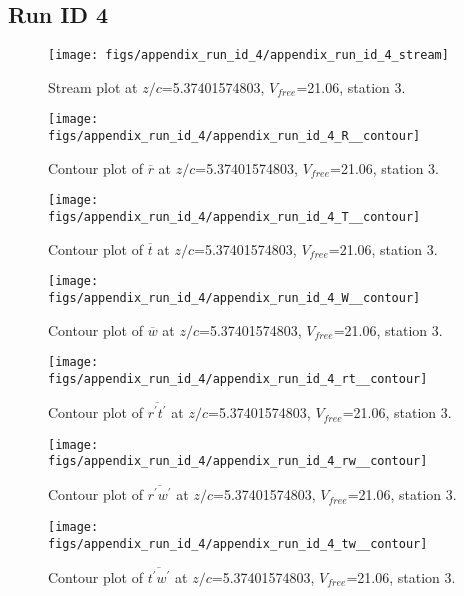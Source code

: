 \subsection{Run ID 4}
\begin{figure}[H]
\centering
\texttt{[image: figs/appendix\_run\_id\_4/appendix\_run\_id\_4\_stream]}
\caption{Stream plot at $z/c$=5.37401574803, $V_{free}$=21.06, station 3.}
\label{fig:appendix_run_id_4_stream}
\end{figure}


\begin{figure}[H]
\centering
\texttt{[image: figs/appendix\_run\_id\_4/appendix\_run\_id\_4\_R\_\_contour]}
\caption{Contour plot of $\overline{r}$ at $z/c$=5.37401574803, $V_{free}$=21.06, station 3.}
\label{fig:appendix_run_id_4_R__contour}
\end{figure}


\begin{figure}[H]
\centering
\texttt{[image: figs/appendix\_run\_id\_4/appendix\_run\_id\_4\_T\_\_contour]}
\caption{Contour plot of $\overline{t}$ at $z/c$=5.37401574803, $V_{free}$=21.06, station 3.}
\label{fig:appendix_run_id_4_T__contour}
\end{figure}


\begin{figure}[H]
\centering
\texttt{[image: figs/appendix\_run\_id\_4/appendix\_run\_id\_4\_W\_\_contour]}
\caption{Contour plot of $\overline{w}$ at $z/c$=5.37401574803, $V_{free}$=21.06, station 3.}
\label{fig:appendix_run_id_4_W__contour}
\end{figure}


\begin{figure}[H]
\centering
\texttt{[image: figs/appendix\_run\_id\_4/appendix\_run\_id\_4\_rt\_\_contour]}
\caption{Contour plot of $\overline{r^\prime t^\prime}$ at $z/c$=5.37401574803, $V_{free}$=21.06, station 3.}
\label{fig:appendix_run_id_4_rt__contour}
\end{figure}


\begin{figure}[H]
\centering
\texttt{[image: figs/appendix\_run\_id\_4/appendix\_run\_id\_4\_rw\_\_contour]}
\caption{Contour plot of $\overline{r^\prime w^\prime}$ at $z/c$=5.37401574803, $V_{free}$=21.06, station 3.}
\label{fig:appendix_run_id_4_rw__contour}
\end{figure}


\begin{figure}[H]
\centering
\texttt{[image: figs/appendix\_run\_id\_4/appendix\_run\_id\_4\_tw\_\_contour]}
\caption{Contour plot of $\overline{t^\prime w^\prime}$ at $z/c$=5.37401574803, $V_{free}$=21.06, station 3.}
\label{fig:appendix_run_id_4_tw__contour}
\end{figure}


